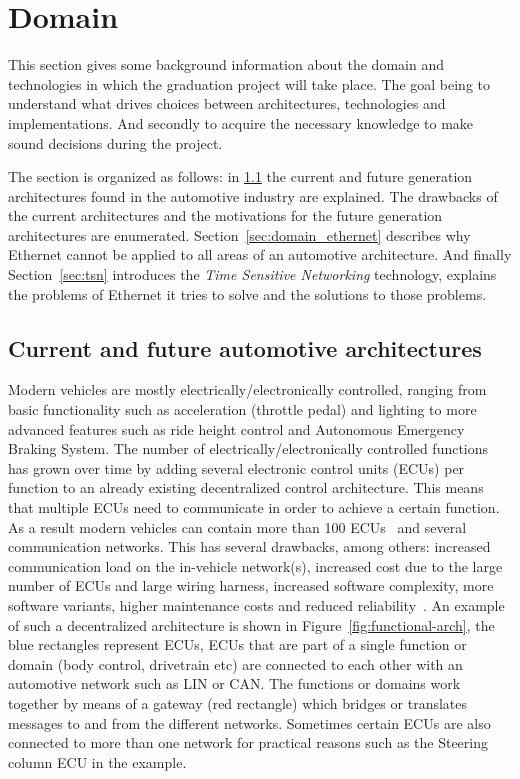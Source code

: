 \section{Domain}
\label{sec:domain}
This section gives some background information about the domain and technologies in which the graduation project will take place. The goal being to understand what drives choices between architectures, technologies and implementations. And secondly to acquire the necessary knowledge to make sound decisions during the project. 

The section is organized as follows: in \ref{sec:automotive-arch} the current and future generation architectures found in the automotive industry are explained. The drawbacks of the current architectures and the motivations for the future generation architectures are enumerated. Section~\ref{sec:domain_ethernet} describes why Ethernet cannot be applied to all areas of an automotive architecture. And finally Section~\ref{sec:tsn} introduces the \textit{Time Sensitive Networking} technology, explains the problems of Ethernet it tries to solve and the solutions to those problems.
\subsection{Current and future automotive architectures}
\label{sec:automotive-arch}
Modern vehicles are mostly electrically/electronically controlled, ranging from basic functionality such as acceleration (throttle pedal) and lighting to more advanced features such as ride height control and Autonomous Emergency Braking System. The number of electrically/electronically controlled functions has grown over time by adding several electronic control units (ECUs) per function to an already existing decentralized control architecture. This means that multiple ECUs need to communicate in order to achieve a certain function. As a result modern vehicles can contain more than 100 ECUs~\cite{bandur2021making} and several communication networks. This has several drawbacks, among others: increased communication load on the in-vehicle network(s), increased cost due to the large number of ECUs and large wiring harness, increased software complexity, more software variants, higher maintenance costs and reduced reliability~\cite{bandur2021making}. An example of such a decentralized architecture is shown in Figure~\ref{fig:functional-arch}, the blue rectangles represent ECUs, ECUs that are part of a single function or domain (body control, drivetrain etc) are connected to each other with an automotive network such as LIN or CAN. The functions or domains work together by means of a gateway (red rectangle) which bridges or translates messages to and from the different networks. Sometimes certain ECUs are also connected to more than one network for practical reasons such as the Steering column ECU in the example.

